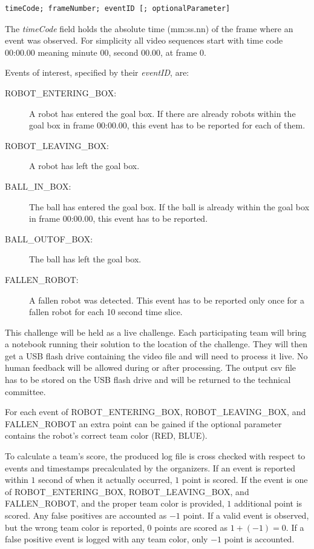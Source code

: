 \documentclass[12pt]{article}
\begin{document}
\begin{verbatim}
timeCode; frameNumber; eventID [; optionalParameter]	
\end{verbatim}

The \emph{timeCode} field holds the absolute time (mm:ss.nn) of the frame where an event was observed. For simplicity all video sequences start with time code 00:00.00 meaning minute 00, second 00.00, at frame $0$.

Events of interest, specified by their \emph{eventID}, are:

\begin{description}
	\item[ROBOT\_ENTERING\_BOX:] A robot has entered the goal box. If there are already robots within the goal box in frame 00:00.00, this event has to be reported for each of them.
	\item[ROBOT\_LEAVING\_BOX:] A robot has left the goal box. 
	\item[BALL\_IN\_BOX:] The ball has entered the goal box. If the ball is already within the goal box in frame 00:00.00, this event has to be reported.
	\item[BALL\_OUTOF\_BOX:] The ball has left the goal box.
	\item[FALLEN\_ROBOT:] A fallen robot was detected. This event has to be reported only once for a fallen robot for each 10 second time slice.
\end{description}

This challenge will be held as a live challenge.  Each participating team will bring a notebook running their solution to the location of the challenge.  They will then get a USB flash drive containing the video file and will need to process it live.  No human feedback will be allowed during or after processing.  The output csv file has to be stored on the USB  flash drive and will be returned to the technical committee.

For each event of ROBOT\_ENTERING\_BOX, ROBOT\_LEAVING\_BOX, and FALLEN\_ROBOT an extra point can be gained if the optional parameter contains the robot's correct team color (RED, BLUE). 

To calculate a team's score, the produced log file is cross checked with respect to events and timestamps precalculated by the organizers. If an event is reported within $1$ second of when it actually occurred, $1$ point is scored. If the event is one of ROBOT\_ENTERING\_BOX, ROBOT\_LEAVING\_BOX, and FALLEN\_ROBOT, and the proper team color is provided, $1$ additional point is scored. Any false positives are accounted as $-1$ point. If a valid event is observed, but the wrong team color is reported, $0$ points are scored as $1+(-1)=0$. If a false positive event is logged with any team color, only $-1$ point is accounted. 
\end{document}
